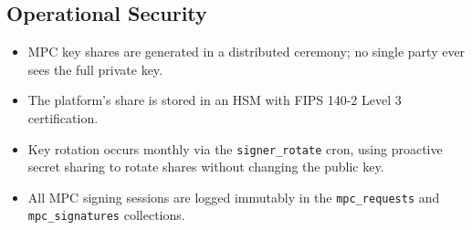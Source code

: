 \subsection{Operational Security}

\begin{itemize}[nosep]
  \item MPC key shares are generated in a distributed ceremony; no single party ever sees the full private key.
  \item The platform's share is stored in an HSM with FIPS 140-2 Level 3 certification.
  \item Key rotation occurs monthly via the \texttt{signer\_rotate} cron, using proactive secret sharing to rotate shares without changing the public key.
  \item All MPC signing sessions are logged immutably in the \texttt{mpc\_requests} and \texttt{mpc\_signatures} collections.
\end{itemize}

